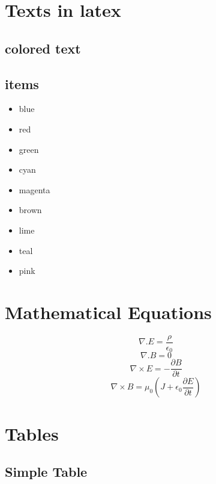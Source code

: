 \documentclass[12pt,a4paper,oneside]{book}
\begin{document}
    \chapter{Texts in latex}
       \section{colored text}
       \textcolor{yellow}{\lipsum[0-1]} \textcolor{green}{\lipsum[0-1]}\textcolor{red}{\lipsum[0-1]}\textcolor{blue}{\lipsum[0-1]} 
       \textcolor{cyan}{\lipsum[0-1]}
       \section{items}
       \begin{itemize}
       \color{blue}\item blue
       \color{red}\item red
       \color{green}\item green
       \color{cyan}\item cyan
       \color{magenta}\item magenta
       \color{brown}\item brown
       \color{lime}\item lime
       \color{teal}\item teal
       \color{pink}\item pink
\end{itemize}    
    \chapter{Mathematical Equations}  
      \begin{center}
       
\huge $$ \nabla.E = \frac{\rho}{\epsilon_0}$$
\huge $$ \nabla . B = 0$$
\huge $$ \nabla \times  E = -\frac{\partial B}{\partial t}$$
\huge $$\nabla \times B = \mu_0(J+\epsilon_0\frac{\partial E}{\partial t})$$
\vspace{2cm}
  
        \end{center}
            

    \chapter{Tables}
        \section{Simple Table}
            \lipsum[1-2]\cite{nuth}\\
\end{document}
